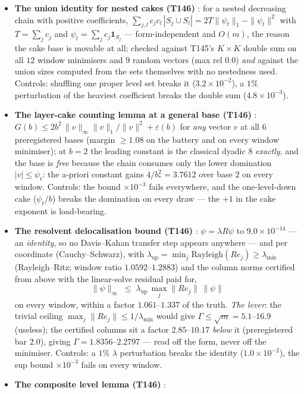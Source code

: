 \documentclass[11pt,a4paper]{article}
\begin{document}
\begin{itemize}[leftmargin=1.5em]
\item \textbf{The union identity for nested cakes (T146)} \mE: for a nested decreasing chain
with positive coefficients,
$\sum_{j,l}c_jc_l\,|S_j\cup S_l|=2T\|\psi_t\|_1-\|\psi_t\|^2$ with $T=\sum_jc_j$ and
$\psi_t=\sum_jc_j\mathbf 1_{S_j}$ --- form-independent and $O(m)$, the reason the cake base is
movable at all; checked against T145's $K\times K$ double sum on all $12$ window minimisers and
$9$ random vectors (max rel $0.0$) \emph{and} against the union sizes computed from the sets
themselves with no nestedness used. Controls: shuffling one proper level set breaks it
($3.2\times10^{-2}$), a $1\%$ perturbation of the heaviest coefficient breaks the double sum
($4.8\times10^{-3}$).
\item \textbf{The layer-cake counting lemma at a general base (T146)} \mE:
$G(b)\le2b^2\,\|v\|_\infty\|v\|_1/\|v\|^2+\varepsilon(b)$ for \emph{any} vector $v$ at all $6$
preregistered bases (margin $\ge1.08$ on the battery and on every window minimiser); at $b=2$
the leading constant is the classical dyadic $8$ \emph{exactly}, and the base is \emph{free}
because the chain consumes only the lower domination $|v|\le\psi_t$: the a-priori constant
gains $4/b_*^2=3.7612$ over base $2$ on every window. Controls: the bound $\times10^{-3}$
fails everywhere, and the one-level-down cake ($\psi_t/b$) breaks the domination on every draw
--- the $+1$ in the cake exponent is load-bearing.
\item \textbf{The resolvent delocalisation bound (T146)} \mE: $\psi=\lambda R\psi$ to
$9.0\times10^{-14}$ --- an \emph{identity}, so no Davis--Kahan transfer step appears anywhere
--- and per coordinate (Cauchy--Schwarz), with $\lambda_{\mathrm{up}}=\min_j
\mathrm{Rayleigh}(Re_j)\ge\lambda_{\min}$ (Rayleigh--Ritz; window ratio $1.0592$--$1.2883$) and
the column norms certified from above with the linear-solve residual paid for,
\[
\|\psi\|_\infty\;\le\;\lambda_{\mathrm{up}}\,\max_j\|R e_j\|\,\|\psi\|
\]
on every window, within a factor $1.061$--$1.337$ of the truth. \emph{The lever}: the trivial
ceiling $\max_j\|Re_j\|\le1/\lambda_{\min}$ would give $\Gamma\le\sqrt m=5.1$--$16.9$
(useless); the certified columns sit a factor $2.85$--$10.17$ \emph{below} it (preregistered
bar $2.0$), giving $\Gamma=1.8356$--$2.2797$ --- read off the form, never off the minimiser.
Controls: a $1\%$ $\lambda$ perturbation breaks the identity ($1.0\times10^{-2}$), the sup
bound $\times10^{-3}$ fails on every window.
\item \textbf{The composite level lemma (T146)} \mE:

\end{itemize}
\end{document}

